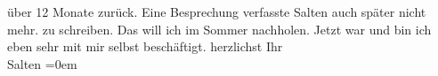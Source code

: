 \begin{ledgroupsized}[t]{13cm}
{{{                  über 12 Monate zurück. Eine Besprechung verfasste Salten auch
               später nicht mehr.}}}\label{K_L03330-4h} zu schreiben. Das will
               ich im Sommer nachholen. Jetzt war und bin
               ich eben sehr mit mir selbst beschäftigt.\pend
           \pstart
           herzlichst Ihr {\\[\baselineskip]}\spacefill\mbox{Salten}\pend
           \leftskip=0em{}
         
         \endnumbering{}\end{ledgroupsized}  \newcommand{\dateiname}{L03330}\newcommand{\titel}{Felix Salten an Arthur Schnitzler, 22. 5. 1902}\newcommand{\editorInnen}{Martin Anton Müller und Laura Untner}
      